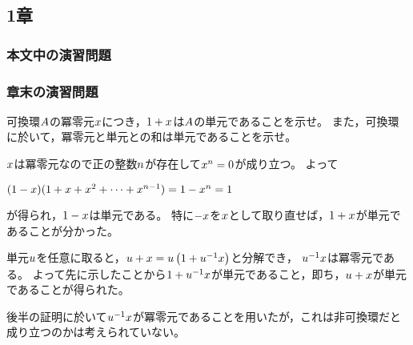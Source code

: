 \subsection{1章}
\subsubsection{本文中の演習問題}
\subsubsection{章末の演習問題}
\begin{exercise}
    可換環\(\CommutativeRing\)の冪零元\(\Element\)につき，\(1+\Element\)は\(\CommutativeRing\)の単元であることを示せ。
    また，可換環に於いて，冪零元と単元との和は単元であることを示せ。
\end{exercise}
\begin{answer}
    \(\Element\)は冪零元なので正の整数\(\NaturalNumber\)が存在して\(\Element^{\NaturalNumber}=0\)が成り立つ。
    よって
    \begin{center}
        \((1-\Element)(1+\Element+\Element^2+\cdots+\Element^{n-1})=1-\Element^{n}=1\)
    \end{center}
    が得られ，\(1-\Element\)は単元である。
    特に\(-\Element\)を\(\Element\)として取り直せば，\(1+\Element\)が単元であることが分かった。

    単元\(\Element<u>\)を任意に取ると，\(\Element<u>+\Element=\Element<u>(1+\Element<u>\Inv\Element)\)と分解でき，
    \(\Element<u>\Inv\Element\)は冪零元である。
    よって先に示したことから\(1+\Element<u>\Inv\Element\)が単元であること，即ち，\(\Element<u>+\Element\)が単元であることが得られた。
\end{answer}
\begin{remark}
    後半の証明に於いて\(\Element<u>\Inv\Element\)が冪零元であることを用いたが，これは非可換環だと成り立つのかは考えられていない。
\end{remark}

\begin{exercise}
    
\end{exercise}